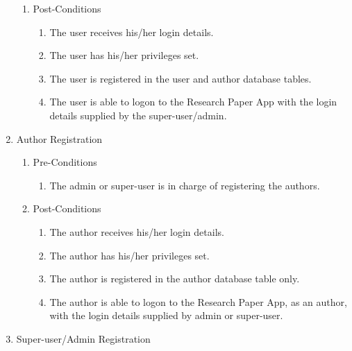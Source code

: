 \documentclass[hidelinks,a4paper,12pt]{article}
\begin{document}
\begin{enumerate}
\begin{enumerate}
			\item  Post-Conditions
			
			\begin{enumerate}
				\item  The user receives his/her login details.
				
				\item  The user has his/her privileges set.
				
				\item  The user is registered in the user and author database tables.
				
				\item  The user is able to logon to the Research Paper App with the login details supplied by the super-user/admin.
			\end{enumerate}
		\end{enumerate}
		
		\noindent  
		
		
		\item  Author Registration
		
		\begin{enumerate}
			\item  Pre-Conditions
			
			\begin{enumerate}
				\item  The admin or super-user is in charge of registering the authors.
			\end{enumerate}
			
			\item  Post-Conditions
			
			\begin{enumerate}
				\item  The author receives his/her login details.
				
				\item  The author has his/her privileges set.
				
				\item  The author is registered in the author database table only.
				
				\item  The author is able to logon to the Research Paper App, as an author, with the login details supplied by admin or super-user.
			\end{enumerate}
		\end{enumerate}
		
		\noindent  
		
		\item  Super-user/Admin Registration
		

\end{enumerate}
\end{document}
